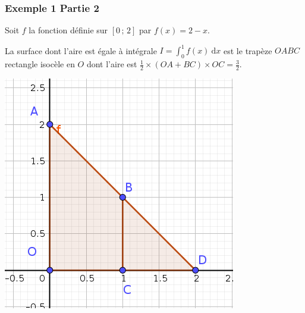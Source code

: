 \documentclass[11pt, hyperref={urlcolor=red,%
            linkcolor=blue, %
            colorlinks=true}]{beamer}
\newcommand{\Interff}[2]{\left[#1\, ;\, #2\right]}
\newcommand{\dx}{\ensuremath{\text{d}x}}		%
\newcommand{\integralex}[3]{\int_{#1}^{#2} #3 \ \dx}
\begin{document}
\begin{frame}
\frametitle{Exemple 1 Partie 2}
Soit $f$ la fonction définie sur $\Interff{0}{2}$ par $f(x)=2-x$.

La surface dont l'aire est égale à  intégrale  $I=\integralex{0}{1}{f(x)}$ est le trapèze $OABC$  rectangle isocèle en $O$  dont l'aire est $\frac{1}{2} \times ( OA + BC) \times OC = \frac{3}{2}$.

\begin{center}
\includegraphics[scale=0.4]{images/exemple1.png}
\end{center}

\end{frame}
\end{document}
